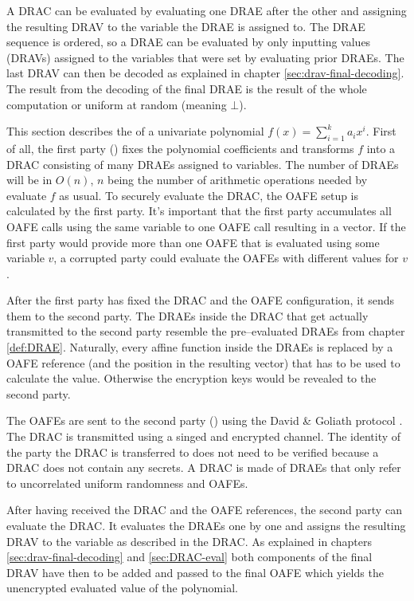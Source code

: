 \label{sec:DRAC-eval}

A DRAC can be evaluated by evaluating one DRAE after the other and assigning the
resulting DRAV to the variable the DRAE is assigned to. The DRAE sequence is
ordered, so a DRAE can be evaluated by only inputting values (DRAVs) assigned to
the variables that were set by evaluating prior DRAEs. The last DRAV can then be
decoded as explained in chapter \ref{sec:drav-final-decoding}. The result from
the decoding of the final DRAE is the result of the whole computation or uniform
at random (meaning $\bot$).


%
%
\label{sec:OPE}

This section describes the  of a
univariate polynomial $f(x) = \sum_{i=1}^k a_ix^i$. First of all, the first
party (\JWpOne{}) fixes the polynomial coefficients and transforms $f$ into a
DRAC consisting of many DRAEs assigned to variables. The number of DRAEs will be
in $O(n)$, $n$ being the number of arithmetic operations needed by evaluate
$f$ as usual. To securely evaluate the DRAC, the OAFE setup is calculated by
the first party. It's important that the first party accumulates all OAFE calls
using the same variable to one OAFE call resulting in a vector. If the first
party would provide more than one OAFE that is evaluated using some variable
$v$, a corrupted party could evaluate the OAFEs with different values for $v$.

After the first party has fixed the DRAC and the OAFE configuration, it sends
them to the second party. The DRAEs inside the DRAC that get actually
transmitted to the second party resemble the pre--evaluated DRAEs from chapter
\ref{def:DRAE}. Naturally, every affine function inside the DRAEs is replaced by
a OAFE reference (and the position in the resulting vector) that has to be used
to calculate the value. Otherwise the encryption keys would be revealed to the
second party.

The OAFEs are sent to the second party (\JWpTwo{}) using the David \& Goliath
protocol \cite{davidgoliath}. The DRAC is transmitted using a singed and
encrypted channel. The identity of the party the DRAC is transferred to does not
need to be verified because a DRAC does not contain any secrets. A DRAC is made
of DRAEs that only refer to uncorrelated uniform randomness and OAFEs.

After having received the DRAC and the OAFE references, the second party can
evaluate the DRAC. It evaluates the DRAEs one by one and assigns the resulting
DRAV to the variable as described in the DRAC. As explained in chapters
\ref{sec:drav-final-decoding} and \ref{sec:DRAC-eval} both components of the
final DRAV have then to be added and passed to the final OAFE which yields the
unencrypted evaluated value of the polynomial.


